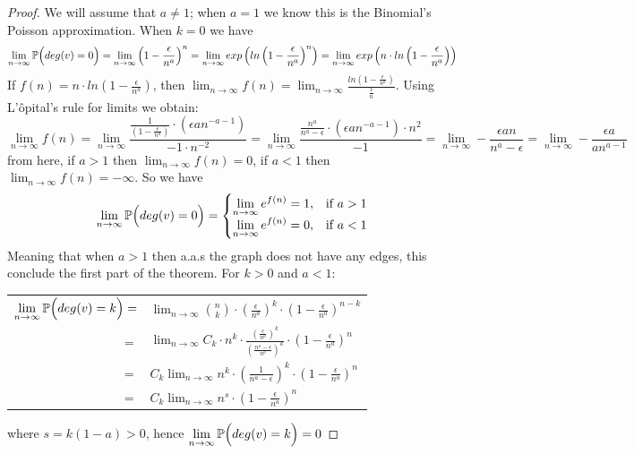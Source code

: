 \begin{proof}
We will assume that $a\neq 1$; when $a=1$ we know this is the Binomial's Poisson approximation. When $k=0$ we have
$$\displaystyle\lim_{n\to \infty} \P\Big(deg(v)= 0\Big) = \displaystyle\lim_{n\to \infty } \left( 1 - \frac{\epsilon}{n^a}\right)^n = \displaystyle\lim_{n\to \infty} exp\left( ln \left( 1 - \frac{\epsilon}{n^a}\right)^n\right) = \displaystyle\lim_{n\to \infty} exp\left(n \cdot ln \left( 1 - \frac{\epsilon}{n^a}\right)\right)$$
If $f(n)=  n \cdot ln \left( 1 - \frac{\epsilon}{n^a}\right)$, then $\displaystyle\lim_{n\to \infty} f(n) = \displaystyle\lim_{n\to \infty}\frac{ln \left( 1 - \frac{\epsilon}{n^a}\right)}{\frac{1}{n}}$. Using L'ôpital's rule for limits we obtain:
$$\displaystyle\lim_{n\to \infty } f(n) = 
\displaystyle\lim_{n\to \infty } \frac{\frac{1}{\left( 1 - \frac{\epsilon}{n^a}\right)}\cdot (\epsilon a n^{-a-1})}
{-1\cdot n^{-2}} = 
\displaystyle\lim_{n\to \infty } \frac{\frac{n^a}{n^{a} - \epsilon}\cdot (\epsilon a n^{-a-1}) \cdot {n^{2}}}{-1} = 
\displaystyle\lim_{n\to \infty } - \frac{\epsilon a n}{n^{a} - \epsilon} =
\displaystyle\lim_{n\to \infty } - \frac{\epsilon a}{a n^{a-1}}
$$
from here, if $a>1$ then $\displaystyle\lim_{n\to \infty } f(n) = 0$, if $a<1$ then $\displaystyle\lim_{n\to \infty } f(n) = -\infty$. So we have
$$ \displaystyle\lim_{n\to \infty} \P\Big(deg(v)=0\Big) = \begin{cases} 
\displaystyle\lim_{n\to \infty}e^{f(n)} = 1, & \mbox{if } a>1 \\ 
\displaystyle\lim_{n\to \infty}e^{f(n)} = 0, & \mbox{if } a<1 \end{cases} $$
Meaning that when $a>1$ then a.a.s the graph does not have any edges, this conclude the first part of the theorem. For $k>0$ and $a<1$:
\begin{center}
\begin{tabular}{ r l }
 $\displaystyle\lim_{n\to \infty } \P\Big(deg(v)=k\Big) =$ & $\displaystyle\lim_{n\to \infty} \binom{n}{k} \cdot \left( \frac{\epsilon}{n^a} \right)^k \cdot \left( 1-\frac{\epsilon}{n^a}\right)^{n-k}$ \\
$=$ &  $\displaystyle\lim_{n\to \infty} C_{k}\cdot n^k\cdot  \frac{\left(\frac{\epsilon}{n^a}\right)^k} {\left(\frac{n^a - \epsilon}{n^a}\right)^k} \cdot \left(1-\frac{\epsilon}{n^a}\right)^{n} $\\
$=$ &  $C_{k}\displaystyle\lim_{n\to \infty} n^k \cdot \left(\frac{1} {n^a - \epsilon}\right)^k \cdot \left(1-\frac{\epsilon}{n^a}\right)^{n} $\\
$=$ &  $C_{k} \displaystyle\lim_{n\to \infty}  n^s\cdot \left(1-\frac{\epsilon}{n^a}\right)^{n}$\\
\end{tabular}
\end{center}

where $s=k(1-a)>0$, hence $\displaystyle\lim_{n\to \infty } \P\Big(deg(v)=k\Big) = 0$

\end{proof}

